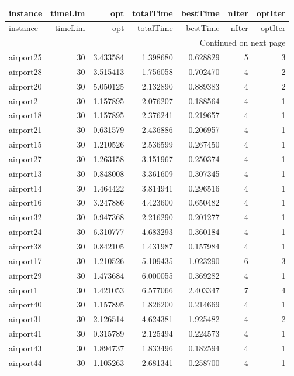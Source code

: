 
\begin{longtable}{|l|r|r|r|r|r|r|}
\toprule
instance & timeLim & opt & totalTime & bestTime & nIter & optIter \\
\midrule
\endfirsthead
\toprule
instance & timeLim & opt & totalTime & bestTime & nIter & optIter \\
\midrule
\endhead
\midrule
\multicolumn{7}{r}{Continued on next page} \\
\midrule
\endfoot
\bottomrule
\endlastfoot
airport25 & 30 & 3.433584 & 1.398680 & 0.628829 & 5 & 3 \\
airport28 & 30 & 3.515413 & 1.756058 & 0.702470 & 4 & 2 \\
airport20 & 30 & 5.050125 & 2.132890 & 0.889383 & 4 & 2 \\
airport2 & 30 & 1.157895 & 2.076207 & 0.188564 & 4 & 1 \\
airport18 & 30 & 1.157895 & 2.376241 & 0.219657 & 4 & 1 \\
airport21 & 30 & 0.631579 & 2.436886 & 0.206957 & 4 & 1 \\
airport15 & 30 & 1.210526 & 2.536599 & 0.267450 & 4 & 1 \\
airport27 & 30 & 1.263158 & 3.151967 & 0.250374 & 4 & 1 \\
airport13 & 30 & 0.848008 & 3.361609 & 0.307345 & 4 & 1 \\
airport14 & 30 & 1.464422 & 3.814941 & 0.296516 & 4 & 1 \\
airport16 & 30 & 3.247886 & 4.423600 & 0.650482 & 4 & 1 \\
airport32 & 30 & 0.947368 & 2.216290 & 0.201277 & 4 & 1 \\
airport24 & 30 & 6.310777 & 4.683293 & 0.360184 & 4 & 1 \\
airport38 & 30 & 0.842105 & 1.431987 & 0.157984 & 4 & 1 \\
airport17 & 30 & 1.210526 & 5.109435 & 1.023290 & 6 & 3 \\
airport29 & 30 & 1.473684 & 6.000055 & 0.369282 & 4 & 1 \\
airport1 & 30 & 1.421053 & 6.577066 & 2.403347 & 7 & 4 \\
airport40 & 30 & 1.157895 & 1.826200 & 0.214669 & 4 & 1 \\
airport31 & 30 & 2.126514 & 4.624381 & 1.925482 & 4 & 2 \\
airport41 & 30 & 0.315789 & 2.125494 & 0.224573 & 4 & 1 \\
airport43 & 30 & 1.894737 & 1.833496 & 0.182594 & 4 & 1 \\
airport44 & 30 & 1.105263 & 2.681341 & 0.258700 & 4 & 1 \\

\end{longtable}
